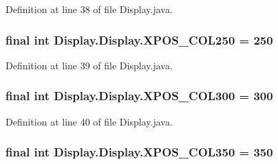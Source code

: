 Definition at line 38 of file Display.\+java.

\hypertarget{class_display_1_1_display_a9bc5732eb1a6077901a5e66984ffa339}{}
\subsubsection[{X\+P\+O\+S\+\_\+\+C\+O\+L250}]{\setlength{\rightskip}{0pt plus 5cm}final int Display.\+Display.\+X\+P\+O\+S\+\_\+\+C\+O\+L250 = 250\hspace{0.3cm}{\ttfamily [static]}}\label{class_display_1_1_display_a9bc5732eb1a6077901a5e66984ffa339}


Definition at line 39 of file Display.\+java.

\hypertarget{class_display_1_1_display_a37098506cf494cbf79cc2ca5e88cd3ac}{}
\subsubsection[{X\+P\+O\+S\+\_\+\+C\+O\+L300}]{\setlength{\rightskip}{0pt plus 5cm}final int Display.\+Display.\+X\+P\+O\+S\+\_\+\+C\+O\+L300 = 300\hspace{0.3cm}{\ttfamily [static]}}\label{class_display_1_1_display_a37098506cf494cbf79cc2ca5e88cd3ac}


Definition at line 40 of file Display.\+java.

\hypertarget{class_display_1_1_display_ac0e291caffea8a2d26755c36464c8418}{}
\subsubsection[{X\+P\+O\+S\+\_\+\+C\+O\+L350}]{\setlength{\rightskip}{0pt plus 5cm}final int Display.\+Display.\+X\+P\+O\+S\+\_\+\+C\+O\+L350 = 350\hspace{0.3cm}{\ttfamily [static]}}\label{class_display_1_1_display_ac0e291caffea8a2d26755c36464c8418}


